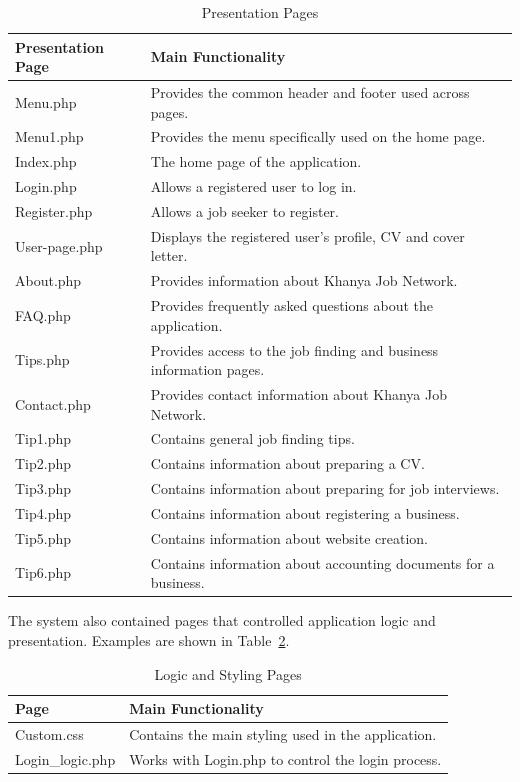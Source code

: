 \begin{table}[H]
\centering
\caption{Presentation Pages}
\label{tab:presentation_pages}
\renewcommand{\arraystretch}{1.2}
\begin{tabularx}{\textwidth}{|p{3.5cm}|X|}
\hline
\rowcolor{gray!30}
Presentation Page & Main Functionality \\
\hline
Menu.php & Provides the common header and footer used across pages. \\
\hline
Menu1.php & Provides the menu specifically used on the home page. \\
\hline
Index.php & The home page of the application. \\
\hline
Login.php & Allows a registered user to log in. \\
\hline
Register.php & Allows a job seeker to register. \\
\hline
User-page.php & Displays the registered user's profile, CV and cover letter. \\
\hline
About.php & Provides information about Khanya Job Network. \\
\hline
FAQ.php & Provides frequently asked questions about the application. \\
\hline
Tips.php & Provides access to the job finding and business information pages. \\
\hline
Contact.php & Provides contact information about Khanya Job Network. \\
\hline
Tip1.php & Contains general job finding tips. \\
\hline
Tip2.php & Contains information about preparing a CV. \\
\hline
Tip3.php & Contains information about preparing for job interviews. \\
\hline
Tip4.php & Contains information about registering a business. \\
\hline
Tip5.php & Contains information about website creation. \\
\hline
Tip6.php & Contains information about accounting documents for a business. \\
\hline
\end{tabularx}
\end{table}

\FloatBarrier

The system also contained pages that controlled application logic and presentation. Examples are shown in Table~\ref{tab:logic_pages}.

\begin{table}[H]
\centering
\caption{Logic and Styling Pages}
\label{tab:logic_pages}
\renewcommand{\arraystretch}{1.2}
\begin{tabularx}{\textwidth}{|p{4cm}|X|}
\hline
\rowcolor{gray!30}
Page & Main Functionality \\
\hline
Custom.css & Contains the main styling used in the application. \\
\hline
Login\_logic.php & Works with Login.php to control the login process. \\
\hline
\end{tabularx}
\end{table}

